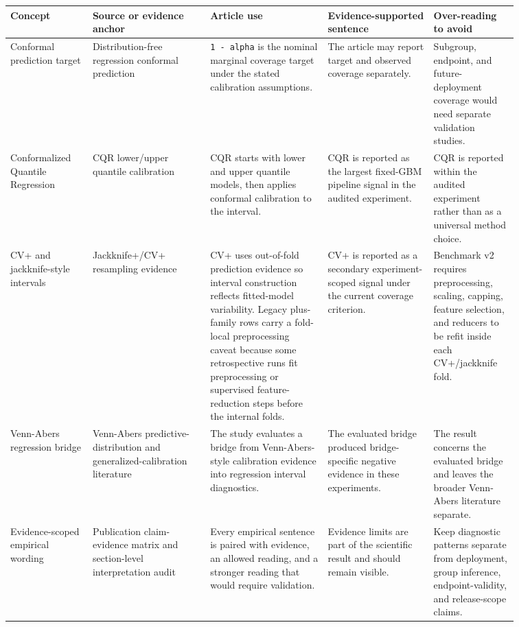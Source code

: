 \documentclass[11pt]{article}
\begin{document}
\begingroup
\footnotesize
\setlength{\tabcolsep}{2pt}
\renewcommand{\arraystretch}{1.18}
\begin{tabular}{@{}>{\RaggedRight\arraybackslash}p{0.140\linewidth}>{\RaggedRight\arraybackslash}p{0.200\linewidth}>{\RaggedRight\arraybackslash}p{0.200\linewidth}>{\RaggedRight\arraybackslash}p{0.180\linewidth}>{\RaggedRight\arraybackslash}p{0.140\linewidth}@{}}
\toprule
Concept & Source or evidence anchor & Article use & Evidence-supported sentence & Over-reading to avoid \\
\midrule
Conformal prediction target & Distribution-free regression conformal prediction \cite{lei2017distribution_free_regression} & \texttt{1 - alpha} is the nominal marginal coverage target under the stated calibration assumptions. & The article may report target and observed coverage separately. & Subgroup, endpoint, and future-deployment coverage would need separate validation studies. \\
Conformalized Quantile Regression & CQR lower/upper quantile calibration \cite{romano2019conformalized_quantile_regression} & CQR starts with lower and upper quantile models, then applies conformal calibration to the interval. & CQR is reported as the largest fixed-GBM pipeline signal in the audited experiment. & CQR is reported within the audited experiment rather than as a universal method choice. \\
CV+ and jackknife-style intervals & Jackknife+/CV+ resampling evidence \cite{barber2020jackknife_plus,kim2020jackknife_after_bootstrap} & CV+ uses out-of-fold prediction evidence so interval construction reflects fitted-model variability. Legacy plus-family rows carry a fold-local preprocessing caveat because some retrospective runs fit preprocessing or supervised feature-reduction steps before the internal folds. & CV+ is reported as a secondary experiment-scoped signal under the current coverage criterion. & Benchmark v2 requires preprocessing, scaling, capping, feature selection, and reducers to be refit inside each CV+/jackknife fold. \\
Venn-Abers regression bridge & Venn-Abers predictive-distribution and generalized-calibration literature \cite{nouretdinov2018ivapd,nouretdinov2024ivapd_applications,vanderlaan2025generalized_venn_abers,petej2026inductive_venn_abers_regressors} & The study evaluates a bridge from Venn-Abers-style calibration evidence into regression interval diagnostics. & The evaluated bridge produced bridge-specific negative evidence in these experiments. & The result concerns the evaluated bridge and leaves the broader Venn-Abers literature separate. \\
Evidence-scoped empirical wording & Publication claim-evidence matrix and section-level interpretation audit & Every empirical sentence is paired with evidence, an allowed reading, and a stronger reading that would require validation. & Evidence limits are part of the scientific result and should remain visible. & Keep diagnostic patterns separate from deployment, group inference, endpoint-validity, and release-scope claims. \\
\bottomrule
\end{tabular}
\endgroup
\end{document}
